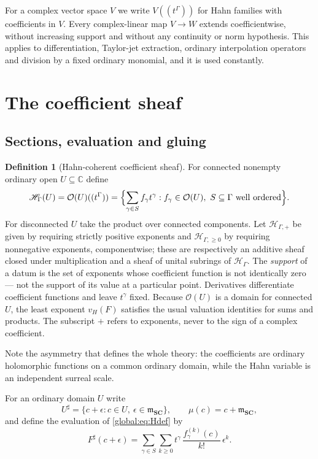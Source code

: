 \documentclass[11pt,letterpaper]{article}
\theoremstyle{definition}
\newtheorem{definition}[definition]{Definition}
\theoremstyle{remark}
\newcommand{\SC}{\mathbf{SC}}
\newcommand{\C}{\mathbb C}
\newcommand{\OO}{\mathcal O}
\newcommand{\HH}{\mathscr H_\Gamma}
\newcommand{\HP}{\mathscr H_{\Gamma,+}}
\newcommand{\HI}{\mathscr H_{\Gamma,\ge0}}
\newcommand{\mSC}{\mathfrak m_{\SC}}
\newcommand{\sh}{^{\sharp}}
\numberwithin{equation}{section}
\begin{document}
For a complex vector space $V$ we write $V((t^\Gamma))$ for Hahn families with coefficients in $V$. Every complex-linear map $V\to W$ extends coefficientwise, without increasing support and without any continuity or norm hypothesis. This applies to differentiation, Taylor-jet extraction, ordinary interpolation operators and division by a fixed ordinary monomial, and it is used constantly.

\section{The coefficient sheaf}\label{global:sec:sheaf}

\subsection{Sections, evaluation and gluing}

\begin{definition}[Hahn-coherent coefficient sheaf]\label{global:def:sheaf}
For connected nonempty ordinary open $U\subseteq\C$ define
\begin{equation}\label{global:eq:Hdef}
  \HH(U)=\OO(U)((t^\Gamma))
  =\Bigl\{\sum_{\gamma\in S}f_\gamma t^\gamma:
  f_\gamma\in\OO(U),\ S\subseteq\Gamma\text{ well ordered}\Bigr\}.
\end{equation}
For disconnected $U$ take the product over connected components. Let $\HP$ be given by requiring strictly positive exponents and $\HI$ by requiring nonnegative exponents, componentwise; these are respectively an additive sheaf closed under multiplication and a sheaf of unital subrings of $\HH$. The \emph{support} of a datum is the set of exponents whose coefficient function is not identically zero --- not the support of its value at a particular point. Derivatives differentiate coefficient functions and leave $t^\gamma$ fixed. Because $\OO(U)$ is a domain for connected $U$, the least exponent $v_H(F)$ satisfies the usual valuation identities for sums and products. The subscript $+$ refers to exponents, never to the sign of a complex coefficient.
\end{definition}

Note the asymmetry that defines the whole theory: the coefficients are ordinary holomorphic functions on a common ordinary domain, while the Hahn variable is an independent surreal scale.

For an ordinary domain $U$ write
\[
  U\sh=\{c+\epsilon:c\in U,\ \epsilon\in\mSC\},
  \qquad \mu(c)=c+\mSC,
\]
and define the evaluation of \eqref{global:eq:Hdef} by
\begin{equation}\label{global:eq:eval}
  F\sh(c+\epsilon)
  =\sum_{\gamma\in S}\sum_{k\ge0}
  t^\gamma\,\frac{f_\gamma^{(k)}(c)}{k!}\,\epsilon^k .
\end{equation}
\end{document}

